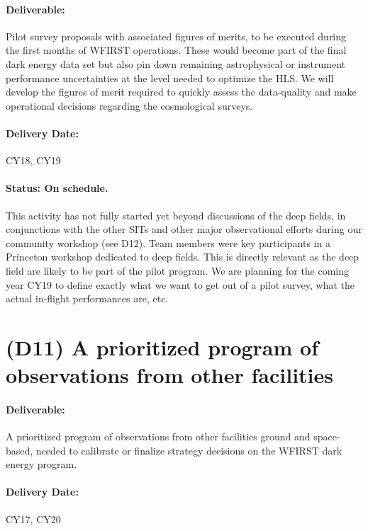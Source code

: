 \paragraph*{Deliverable:} Pilot survey proposals with associated figures of merits, to be executed during the first months of WFIRST operations. These would become
part of the final dark energy data set but also pin down remaining astrophysical
or instrument performance uncertainties at the level needed to optimize the HLS.
We will develop the figures of merit required to quickly assess the data-quality
and make operational decisions regarding the cosmological surveys.

\paragraph*{Delivery Date:} CY18, CY19

\paragraph*{Status: On schedule.} This activity has not fully started yet beyond discussions of the deep fields, in conjunctions with the other SITs and other major observational efforts during our community workshop (see D12). Team members were key participants in a Princeton workshop dedicated to deep fields. This is directly relevant as the deep field are likely to be part of the pilot program. We are planning for the coming year CY19 to define exactly what we want to get out of a pilot survey, what the actual in-flight performances are, etc.

\section*{(D11) A prioritized program of observations from other facilities}

\paragraph*{Deliverable:} A prioritized program of observations from other facilities
ground and space-based, needed to calibrate or finalize strategy decisions on
the WFIRST dark energy program.

\paragraph*{Delivery Date:} CY17, CY20

